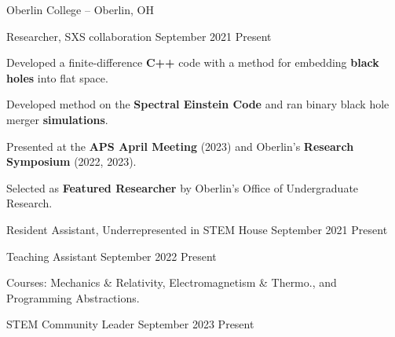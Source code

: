 \begin{entry}{Oberlin College -- Oberlin, OH}

	\entryItem
		{Researcher, SXS collaboration}
		{September 2021}
		{Present}

		\begin{items}
			\item Developed a finite-difference \textbf{C++} code with a method for embedding \textbf{black holes} into flat space.
			\item Developed method on the \textbf{Spectral Einstein Code} and ran binary black hole merger \textbf{simulations}.
			\item Presented at the \textbf{APS April Meeting} (2023) and Oberlin's \textbf{Research Symposium} (2022, 2023).
			\item Selected as \textbf{Featured Researcher} by Oberlin's Office of Undergraduate Research.
		\end{items}

	\entryItem
		{Resident Assistant, Underrepresented in STEM House}
		{September 2021}
		{Present}

	\entryItem
		{Teaching Assistant}
		{September 2022}
		{Present}

		\begin{items}
			\item Courses: Mechanics \& Relativity, Electromagnetism \& Thermo., and Programming Abstractions.
		\end{items}

	\entryItem
		{STEM Community Leader}
		{September 2023}
		{Present}
	
\end{entry}
